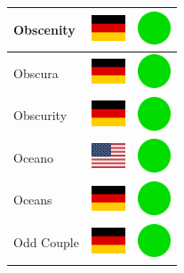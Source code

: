 \documentclass[12pt, a4paper, twoside]{report}
\begin{document}
\begin{center}
\begin{longtable}{|p{5cm}|p{2cm}|p{2cm}|}
 Obscenity                                                  & \includegraphics[width=1cm]{../img/flags/de} &   \includegraphics[width=1cm]{../likes/y} \\ \hline
 Obscura                                                    & \includegraphics[width=1cm]{../img/flags/de} &   \includegraphics[width=1cm]{../likes/y} \\ \hline
 Obscurity                                                  & \includegraphics[width=1cm]{../img/flags/de} &   \includegraphics[width=1cm]{../likes/y} \\ \hline
 Oceano                                                     & \includegraphics[width=1cm]{../img/flags/us} &   \includegraphics[width=1cm]{../likes/y} \\ \hline
 Oceans                                                     & \includegraphics[width=1cm]{../img/flags/de} &   \includegraphics[width=1cm]{../likes/y} \\ \hline
 Odd Couple                                                 & \includegraphics[width=1cm]{../img/flags/de} &   \includegraphics[width=1cm]{../likes/y} \\ \hline

\end{longtable}
\end{center}
\end{document}
